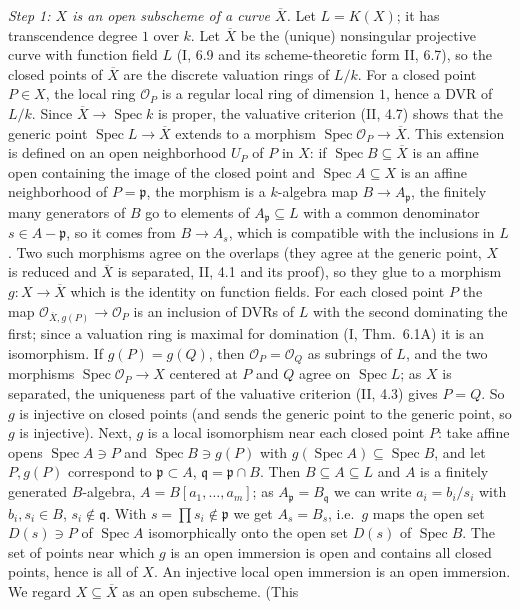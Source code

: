 \documentclass[11pt]{article}
\begin{document}
\pf
\emph{Step 1: $X$ is an open subscheme of a curve $\overline X$.} Let $L=K(X)$; it has transcendence degree $1$ over $k$. Let $\overline X$ be the (unique) nonsingular projective curve with function field $L$ (I, 6.9 and its scheme-theoretic form II, 6.7), so the closed points of $\overline X$ are the discrete valuation rings of $L/k$. For a closed point $P\in X$, the local ring $\mathcal O_P$ is a regular local ring of dimension $1$, hence a DVR of $L/k$. Since $\overline X\to\operatorname{Spec}k$ is proper, the valuative criterion (II, 4.7) shows that the generic point $\operatorname{Spec}L\to\overline X$ extends to a morphism $\operatorname{Spec}\mathcal O_P\to\overline X$. This extension is defined on an open neighborhood $U_P$ of $P$ in $X$: if $\operatorname{Spec}B\subseteq\overline X$ is an affine open containing the image of the closed point and $\operatorname{Spec}A\subseteq X$ is an affine neighborhood of $P=\mathfrak p$, the morphism is a $k$-algebra map $B\to A_{\mathfrak p}$, the finitely many generators of $B$ go to elements of $A_{\mathfrak p}\subseteq L$ with a common denominator $s\in A-\mathfrak p$, so it comes from $B\to A_s$, which is compatible with the inclusions in $L$. Two such morphisms agree on the overlaps (they agree at the generic point, $X$ is reduced and $\overline X$ is separated, II, 4.1 and its proof), so they glue to a morphism $g:X\to\overline X$ which is the identity on function fields. For each closed point $P$ the map $\mathcal O_{\overline X,g(P)}\to\mathcal O_P$ is an inclusion of DVRs of $L$ with the second dominating the first; since a valuation ring is maximal for domination (I, Thm.~6.1A) it is an isomorphism. If $g(P)=g(Q)$, then $\mathcal O_P=\mathcal O_Q$ as subrings of $L$, and the two morphisms $\operatorname{Spec}\mathcal O_P\to X$ centered at $P$ and $Q$ agree on $\operatorname{Spec}L$; as $X$ is separated, the uniqueness part of the valuative criterion (II, 4.3) gives $P=Q$. So $g$ is injective on closed points (and sends the generic point to the generic point, so $g$ is injective). Next, $g$ is a local isomorphism near each closed point $P$: take affine opens $\operatorname{Spec}A\ni P$ and $\operatorname{Spec}B\ni g(P)$ with $g(\operatorname{Spec}A)\subseteq\operatorname{Spec}B$, and let $P,g(P)$ correspond to $\mathfrak p\subset A$, $\mathfrak q=\mathfrak p\cap B$. Then $B\subseteq A\subseteq L$ and $A$ is a finitely generated $B$-algebra, $A=B[a_1,\dots,a_m]$; as $A_{\mathfrak p}=B_{\mathfrak q}$ we can write $a_i=b_i/s_i$ with $b_i,s_i\in B$, $s_i\notin\mathfrak q$. With $s=\prod s_i\notin\mathfrak p$ we get $A_s=B_s$, i.e.\ $g$ maps the open set $D(s)\ni P$ of $\operatorname{Spec}A$ isomorphically onto the open set $D(s)$ of $\operatorname{Spec}B$. The set of points near which $g$ is an open immersion is open and contains all closed points, hence is all of $X$. An injective local open immersion is an open immersion. We regard $X\subseteq\overline X$ as an open subscheme. (This 
\end{document}
